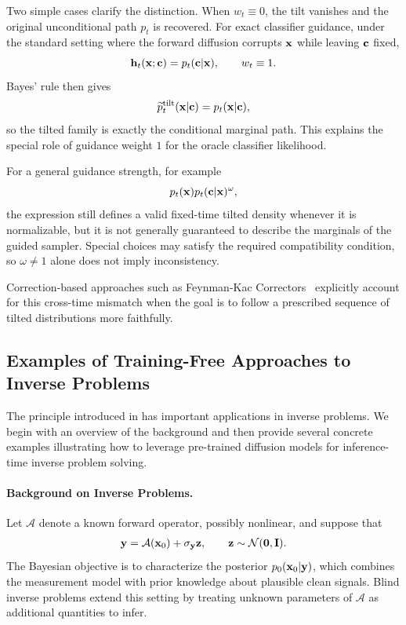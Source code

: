 Two simple cases clarify the distinction. When $w_t\equiv0$, the tilt vanishes
and the original unconditional path $p_t$ is recovered. For exact classifier
guidance, under the standard setting where the forward diffusion corrupts
${\mathbf{x}}$ while leaving ${\mathbf{c}}$ fixed,
\[
{\mathbf{h}}_t({\mathbf{x}};{\mathbf{c}})
=
p_t({\mathbf{c}}|{\mathbf{x}}),
\qquad
w_t\equiv1.
\]
Bayes' rule then gives
\[
\widetilde p_t^{\mathrm{tilt}}({\mathbf{x}}|{\mathbf{c}})
=
p_t({\mathbf{x}}|{\mathbf{c}}),
\]
so the tilted family is exactly the conditional marginal path. This explains
the special role of guidance weight $1$ for the oracle classifier likelihood.

For a general guidance strength, for example
\[
p_t({\mathbf{x}}) p_t({\mathbf{c}}|{\mathbf{x}})^\omega,
\]
the expression still defines a valid fixed-time tilted density whenever it is
normalizable, but it is not generally guaranteed to describe the marginals of
the guided sampler. Special choices may satisfy the required compatibility
condition, so $\omega\neq1$ alone does not imply inconsistency.

Correction-based approaches such as Feynman-Kac
Correctors~\citep{skreta2025feynman} explicitly account for this cross-time
mismatch when the goal is to follow a prescribed sequence of tilted
distributions more faithfully.

\subsection{Examples of Training-Free Approaches to Inverse Problems}\label{subsec:inverse-problem}
The principle introduced in  has important applications in inverse problems. We begin with an overview of the background and then provide several concrete examples illustrating how to leverage pre-trained diffusion models for inference-time inverse problem solving.


\paragraph{Background on Inverse Problems.}
Let $\mathcal A$ denote a known forward operator, possibly nonlinear, and
suppose that
\begin{align}\label{eq:inverse_problem}
{\mathbf{y}}
=
\mathcal A({\mathbf{x}}_0)
+
\sigma_{{\mathbf{y}}}{\mathbf{z}},
\qquad
{\mathbf{z}}\sim\mathcal N(\bm 0,{\mathbf{I}}).
\end{align}
The Bayesian objective is to characterize the posterior
$p_0({\mathbf{x}}_0|{\mathbf{y}})$, which combines the measurement model with prior knowledge
about plausible clean signals. Blind inverse problems extend this setting by
treating unknown parameters of $\mathcal A$ as additional quantities to infer.

